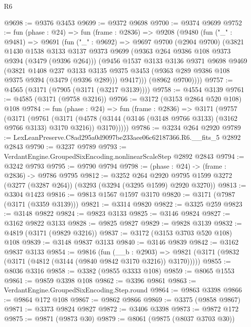 \begin{lexlean}{R6}
\begin{coremodule}
@9698 := @9376 @3453
@9699 := @9372 @9698
@9700 := @9374 @9699
@9752 := fun (phase : @24) =>
  fun (frame : @2836) =>
  @9208
    (@9480
      (fun ("_" : @9481) =>
      @9691
        (fun ("_" : @9692) =>
        @9697
          @9700
          (@2904 @9700)
          (@3821
            @1430
            @1538
            @3133
            @3137
            @9373
            @9699
            (@9363 @264 @9386 @108 @9373 @9394 (@3479 (@9396 @264)))
            (@9456
              @1537
              @3133
              @3136
              @9371
              @9698
              @9469
              (@3821
                @1408
                @237
                @3133
                @3135
                @9375
                @3453
                (@9363 @289 @9386 @108 @9375 @9394 (@3479 (@9396 @289)))
                @9417)))
          (@8962 @9700))))
@9757 := @4565 (@3171 (@7905 (@3171 (@3217 @3139))))
@9758 := @4554 @3139
@9761 := @4585 (@3171 (@9758 @3216))
@9766 := @3172 (@3153 @2864 @520 @108) @108
@9784 := fun (phase : @24) =>
  fun (frame : @2836) =>
  @3171
    (@9757
      (@3171
        (@9761
          (@3171
            (@4578 (@3144 (@3146 (@3148 @9766 @3133) (@3162 @9766 @3133) @3170 @3216)) @3170)))))
@9786 := @3234 @264 @2920
@9789 := LexLeanPreserve.C8ad295a0d9097be233aee06c62187366.R6.__fits_5 @2892 @2843
@9790 := @3237 @9789
@9793 := VerdantEngine.GroupedSixEncoding.nonlinearScaleStep @2892 @2843
@9794 := @3242 @9793
@9795 := @9790 @9794
@9798 := (phase : @24) -> (frame : @2836) -> @9786 @9795
@9812 := @3252
    @264
    @2920
    @9795
    @1599
    @3272
    (@3277 (@3287 @264))
    (@3293 (@3294 (@3295 @1599) @2920 @3270))
@9813 := @3304 @1423
@9816 := @9813 @1567 @1597 @3170
@9820 := @3171 (@7987 (@3171 (@3359 @3139)))
@9821 := @3314 @9820
@9822 := @3325 @259
@9823 := @3148 @9822
@9824 := @9823 @3133
@9825 := @3146 @9824
@9827 := @3162 @9822 @3133
@9828 := @9825 @9827
@9829 := @9828 @3139
@9832 := @4819 (@3171 (@9829 @3216))
@9837 := @3172 (@3153 @3703 @520 @108) @108
@9839 := @3148 @9837 @3133
@9840 := @3146 @9839
@9842 := @3162 @9837 @3133
@9854 := @9816
    (fun (__b : @2903) =>
    @9821 (@3171 (@9832 (@3171 (@4812 (@3144 (@9840 @9842 @3170 @3216)) @3170)))))
@9855 := @8036 @3316
@9858 := @3382 (@9855 @3333 @108)
@9859 := @8065 @1553
@9861 := @9859 @3398 @108
@9862 := @3396 @9861
@9863 := VerdantEngine.GroupedSixEncoding.Step.round
@9864 := @9863 @3398
@9866 := @9864 @172 @108
@9867 := @9862 @9866
@9869 := @3375 (@9858 @9867)
@9871 := @3373 @9824 @9827
@9872 := @3406 @3398
@9873 := @9872 @172
@9875 := @9871 (@9873 @30)
@9879 := @8061 (@9875 (@8037 @3703 @30))

\end{coremodule}
\end{lexlean}
